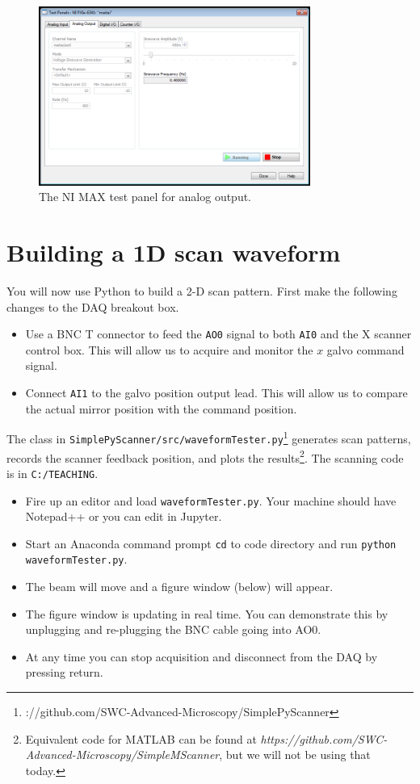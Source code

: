 \documentclass[a4paper]{report}
\begin{document}
\begin{figure}[h]
\centering
\includegraphics[width=3.5in]{MAX_for_1D.png}
\caption{The NI MAX test panel for analog output.}
\label{DAQMX}
\end{figure}



\clearpage

\section{Building a 1D scan waveform}

You will now use Python to build a 2-D scan pattern. 
First make the following changes to the DAQ breakout box. 

\begin{itemize}
    \setlength\itemsep{0.15em}
    \item Use a BNC T connector to feed the \texttt{AO0} signal to both \texttt{AI0} and the X scanner control box. This will allow us to acquire and monitor the $x$ galvo command signal.
    \item Connect \texttt{AI1} to the galvo position output lead. This will allow us to compare the actual mirror position with the command position.
\end{itemize}

\noindent
The class in \texttt{SimplePyScanner/src/waveformTester.py}\footnote{\textithttps://github.com/SWC-Advanced-Microscopy/SimplePyScanner} generates scan patterns, records the scanner feedback position, and plots the results\footnote{Equivalent code for MATLAB can be found at \textit{https://github.com/SWC-Advanced-Microscopy/SimpleMScanner}, but we will not be using that today.}.  
The scanning code is in \texttt{C:/TEACHING}. 


\begin{itemize}
\setlength\itemsep{0.15em}
\item Fire up an editor and load \texttt{waveformTester.py}. Your machine should have Notepad++ or you can edit in Jupyter.
\item Start an Anaconda command prompt \texttt{cd} to code directory and run \texttt{python waveformTester.py}. 
\item The beam will move and a figure window (below) will appear.
\item The figure window is updating in real time. You can demonstrate this by unplugging and re-plugging the BNC cable going into AO0. 
\item At any time you can stop acquisition and disconnect from the DAQ by pressing return. 
\end{itemize}
\end{document}
